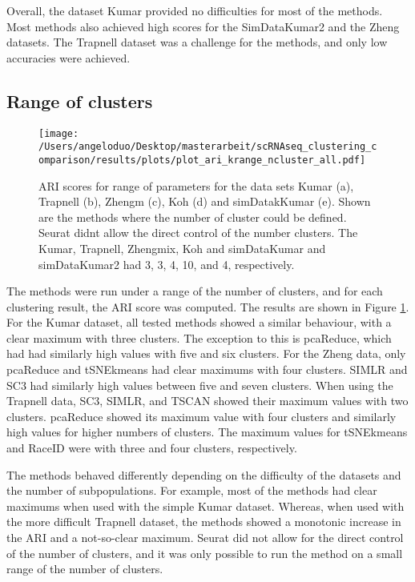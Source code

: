 \documentclass[12pt, a4paper]{article}\usepackage[]{graphicx}\usepackage[]{color}
\begin{document}
Overall, the dataset Kumar provided no difficulties for most of the methods. Most methods also achieved high scores for the SimDataKumar2 and the Zheng datasets. The Trapnell dataset was a challenge for the methods, and only low accuracies were achieved.


\subsection{Range of clusters}
\begin{figure}[!h]
\texttt{[image: /Users/angeloduo/Desktop/masterarbeit/scRNAseq\_clustering\_comparison/results/plots/plot\_ari\_krange\_ncluster\_all.pdf]}
\caption{ARI scores for range of parameters for the data sets Kumar (a), Trapnell (b), Zhengm (c), Koh (d) and simDatakKumar (e). Shown are the methods where the number of cluster could be defined. Seurat didnt allow the direct control of the number clusters. The Kumar, Trapnell, Zhengmix, Koh and simDataKumar and simDataKumar2 had 3, 3, 4, 10, and 4, respectively.}
\label{fig:arirangeall}
\end{figure}

The methods were run under a range of the number of clusters, and for each clustering result, the ARI score was computed. The results are shown in Figure \ref{fig:arirangeall}. For the Kumar dataset, all tested methods showed a similar behaviour, with a clear maximum with three clusters. The exception to this is pcaReduce, which had had similarly high values with five and six clusters. For the Zheng data, only pcaReduce and tSNEkmeans had clear maximums with four clusters. SIMLR and SC3 had similarly high values between five and seven clusters. When using the Trapnell data, SC3, SIMLR, and TSCAN showed their maximum values with two clusters. pcaReduce showed its maximum value with four clusters and similarly high values for higher numbers of clusters. The maximum values for tSNEkmeans and RaceID were with three and four clusters, respectively.

The methods behaved differently depending on the difficulty of the datasets and the number of subpopulations. For example, most of the methods had clear maximums when used with the simple Kumar dataset. Whereas, when used with the more difficult Trapnell dataset, the methods showed a monotonic increase in the ARI and a not-so-clear maximum. Seurat did not allow for the direct control of the number of clusters, and it was only possible to run the method on a small range of the number of clusters.
\end{document}

